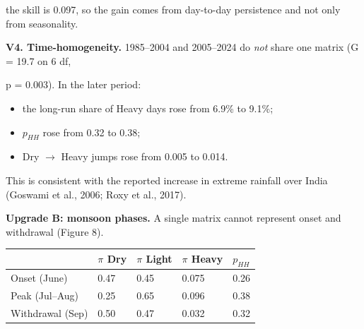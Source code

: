 \documentclass[11pt,a4paper]{article}
\providecommand{\tightlist}{\setlength{\itemsep}{0pt}\setlength{\parskip}{0pt}}
\begin{document}
the skill is 0.097, so the gain comes from day-to-day persistence and not only from seasonality.



\textbf{V4. Time-homogeneity.} 1985--2004 and 2005--2024 do \emph{not} share one matrix (G = 19.7 on 6 df,

p = 0.003). In the later period:



\begin{itemize}

\tightlist

\item

  the long-run share of Heavy days rose from 6.9\% to 9.1\%;

\item

  \(p_{HH}\) rose from 0.32 to 0.38;

\item

  Dry $\rightarrow$ Heavy jumps rose from 0.005 to 0.014.

\end{itemize}



This is consistent with the reported increase in extreme rainfall over India (Goswami et al., 2006; Roxy et al., 2017).



\textbf{Upgrade B: monsoon phases.} A single matrix cannot represent onset and withdrawal (Figure 8).



{\def\LTcaptype{none} %

\begin{longtable}[]{@{}lllll@{}}

\toprule\noalign{}

& $\pi$ Dry & $\pi$ Light & $\pi$ Heavy & \(p_{HH}\) \\

\midrule\noalign{}

\endhead

\bottomrule\noalign{}

\endlastfoot

Onset (June) & 0.47 & 0.45 & 0.075 & 0.26 \\

Peak (Jul--Aug) & 0.25 & 0.65 & 0.096 & 0.38 \\

Withdrawal (Sep) & 0.50 & 0.47 & 0.032 & 0.32 \\

\end{longtable}

}
\end{document}
